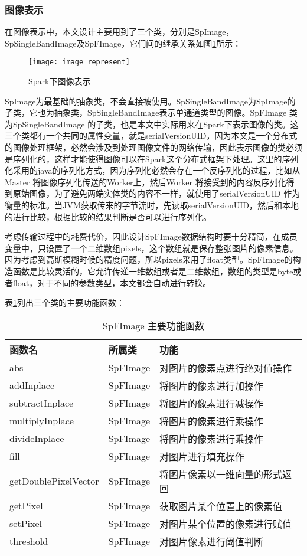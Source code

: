 \subsubsection{图像表示}
在图像表示中，本文设计主要用到了三个类，分别是SpImage，SpSingleBandImage及SpFImage，它们间的继承关系如图\ref{fig:image_represent}所示：
\begin{figure}[htp]
\centering
\texttt{[image: image\_represent]}
\caption{Spark下图像表示}
\label{fig:image_represent}
\end{figure}
SpImage为最基础的抽象类，不会直接被使用。SpSingleBandImage为SpImage的子类，它也为抽象类，SpSingleBandImage表示单通道类型的图像。SpFImage 类为SpSingleBandImage 的子类，也是本文中实际用来在Spark下表示图像的类。这三个类都有一个共同的属性变量，就是serialVersionUID，因为本文是一个分布式的图像处理框架，必然会涉及到处理图像文件的网络传输，因此表示图像的类必须是序列化的，这样才能使得图像可以在Spark这个分布式框架下处理。这里的序列化采用的java的序列化方式，因为序列化必然会存在一个反序列化的过程，比如从Master 将图像序列化传送的Worker上，然后Worker 将接受到的内容反序列化得到原始图像，为了避免两端实体类的内容不一样，就使用了serialVersionUID 作为衡量的标准。当JVM获取传来的字节流时，先读取serialVersionUID，然后和本地的进行比较，根据比较的结果判断是否可以进行序列化。

考虑传输过程中的耗费代价，因此设计SpFImage数据结构时要十分精简，在成员变量中，只设置了一个二维数组pixels，这个数组就是保存整张图片的像素信息。因为考虑到高斯模糊时候的精度问题，所以pixels采用了float类型。SpFImage的构造函数是比较灵活的，它允许传递一维数组或者是二维数组，数组的类型是byte或者float，对于不同的参数类型，本文都会自动进行转换。

表\ref{tab:SpFImage_function}列出三个类的主要功能函数：
\begin{table}[h] %
\caption{SpFImage 主要功能函数} %
\centering
\label{tab:SpFImage_function}
\begin{tabular}{p{4cm}|p{2cm}|p{6cm}} %
\hline
\hline
函数名  & 所属类 & 功能 \\ %
\hline %
abs  & SpFImage & 对图片的像素点进行绝对值操作\\
\hline
addInplace  & SpFImage & 将图片的像素进行加操作\\
\hline
subtractInplace  & SpFImage & 将图片的像素进行减操作\\
\hline
multiplyInplace  & SpFImage & 将图片的像素进行乘操作\\
\hline
divideInplace  & SpFImage & 将图片的像素进行乘操作\\
\hline
fill  & SpFImage & 对图片进行填充操作\\
\hline
getDoublePixelVector & SpFImage & 将图片像素以一维向量的形式返回\\
\hline
getPixel& SpFImage & 获取图片某个位置上的像素值\\
\hline
setPixel & SpFImage & 对图片某个位置的像素进行赋值\\
\hline
threshold & SpFImage & 对图片像素进行阈值判断\\
\hline
\hline
\end{tabular}
\end{table}
